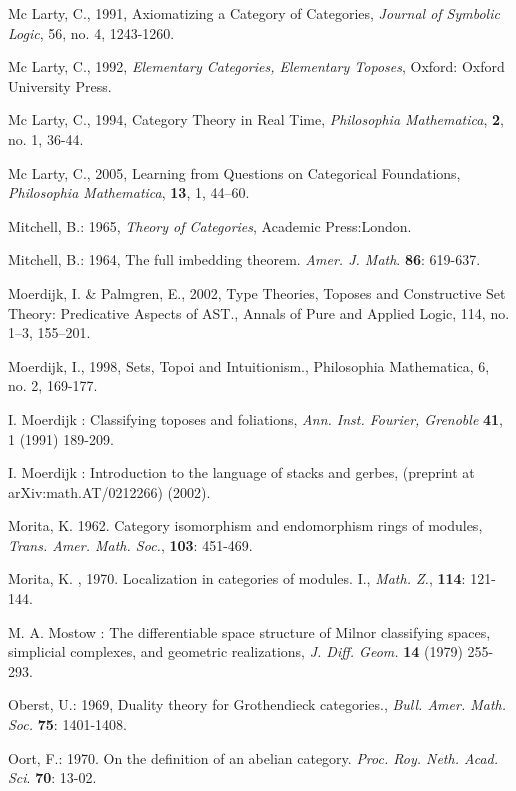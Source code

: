 \documentclass[12pt]{article}
\theoremstyle{plain}
\theoremstyle{definition}
\numberwithin{equation}{section}
\begin{document}
\begin{thebibliography}{199}
Mc Larty, C., 1991, Axiomatizing a Category of Categories, {\em Journal of Symbolic Logic}, 56, no. 4, 1243-1260. 

Mc Larty, C., 1992, {\em Elementary Categories, Elementary Toposes}, Oxford: Oxford University Press.

Mc Larty, C., 1994, Category Theory in Real Time, {\em Philosophia Mathematica}, \textbf{2}, no. 1, 36-44.

Mc Larty, C., 2005, Learning from Questions on Categorical Foundations, {\em Philosophia Mathematica}, \textbf{13}, 1, 44--60.

Mitchell, B.: 1965, \emph{Theory of Categories}, Academic Press:London.

Mitchell, B.: 1964, The full imbedding theorem. \emph{Amer. J. Math}. \textbf{86}: 619-637.

Moerdijk, I. \& Palmgren, E., 2002, Type Theories, Toposes and Constructive Set Theory: Predicative Aspects of AST., Annals of Pure and Applied Logic, 114, no. 1--3, 155--201. 

Moerdijk, I., 1998, Sets, Topoi and Intuitionism., Philosophia Mathematica, 6, no. 2, 169-177.

I. Moerdijk : Classifying toposes and foliations, {\it Ann. Inst. Fourier, Grenoble} \textbf{41}, 1 (1991) 189-209.

I. Moerdijk : Introduction to the language of stacks and gerbes, (preprint at arXiv:math.AT/0212266) (2002).

Morita, K. 1962. Category isomorphism and endomorphism rings of modules,
{\em Trans. Amer. Math. Soc.}, \textbf{103}: 451-469.

Morita, K. , 1970. Localization in categories of modules. I., {\em Math. Z.}, 
\textbf{114}: 121-144.

M. A. Mostow : The differentiable space structure of Milnor classifying spaces, simplicial complexes, and geometric
realizations, \emph{J. Diff. Geom.} \textbf{14} (1979) 255-293.

Oberst, U.: 1969, Duality theory for Grothendieck categories., \emph{Bull. Amer. Math. Soc.} \textbf{75}: 1401-1408.

Oort, F.: 1970. On the definition of an abelian category. \emph{Proc. Roy. Neth. Acad. Sci}. \textbf{70}: 13-02.


\end{thebibliography}
\end{document}
